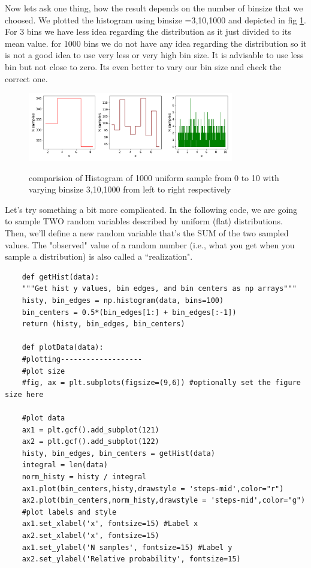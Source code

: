 \documentclass[a4paper,13pt]{report}
\begin{document}
 Now lets ask one thing, how the result depends on the number of binsize that we choosed. We plotted the histogram using binsize =3,10,1000 and depicted in fig \ref{l1p2}. For 3 bins we have less idea regarding the distribution as it just divided to its mean value. for 1000 bins we do not have any idea regarding the distribution so it is not a good idea to use very less or very high bin size. It is advisable to use less bin but not close to zero. Its even better to vary our bin size and check the correct one.\\
  \begin{figure}[h!]
 	\centering
 	\includegraphics[width=0.8\textwidth]{../lec1pic2.pdf}
 	\label{l1p2}
 	\caption{comparision of Histogram of 1000 uniform sample from 0 to 10 with varying binsize 3,10,1000 from left to right respectively}
 \end{figure}
Let's try something a bit more complicated. In the following code, we are going to sample TWO random variables described by uniform (flat) distributions. Then, we'll define a new random variable that's the SUM of the two sampled values. The "observed" value of a random number (i.e., what you get when you sample a distribution) is also called a ``realization".
\begin{verbatim}
	def getHist(data):
	"""Get hist y values, bin edges, and bin centers as np arrays"""
	histy, bin_edges = np.histogram(data, bins=100)
	bin_centers = 0.5*(bin_edges[1:] + bin_edges[:-1])
	return (histy, bin_edges, bin_centers)
	
	def plotData(data):
	#plotting-------------------
	#plot size
	#fig, ax = plt.subplots(figsize=(9,6)) #optionally set the figure size here
	
	#plot data
	ax1 = plt.gcf().add_subplot(121)
	ax2 = plt.gcf().add_subplot(122)
	histy, bin_edges, bin_centers = getHist(data)
	integral = len(data)
	norm_histy = histy / integral
	ax1.plot(bin_centers,histy,drawstyle = 'steps-mid',color="r")
	ax2.plot(bin_centers,norm_histy,drawstyle = 'steps-mid',color="g")
	#plot labels and style
	ax1.set_xlabel('x', fontsize=15) #Label x
	ax2.set_xlabel('x', fontsize=15)
	ax1.set_ylabel('N samples', fontsize=15) #Label y
	ax2.set_ylabel('Relative probability', fontsize=15)
\end{verbatim}
\end{document}
